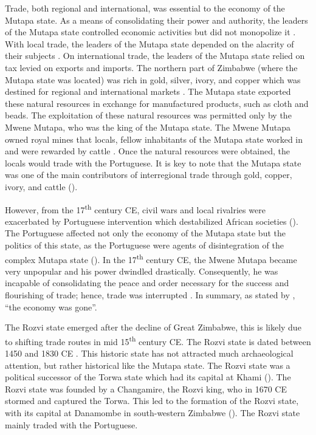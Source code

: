 Trade, both regional and international, was essential to the economy of the Mutapa state. As a means of consolidating their power and authority, the leaders of the Mutapa state controlled economic activities but did not monopolize it
\parencites{mudenge1974}{mudenge1988}.
With local trade, the leaders of the Mutapa state depended on the alacrity of their subjects \parencite{chanaiwa1972}.
On international trade, the leaders of the Mutapa state relied on tax levied on exports and imports. The northern part of Zimbabwe (where the Mutapa state was located) was rich in gold, silver, ivory, and copper which was destined for regional and international markets
\parencite{chanaiwa1972}. The Mutapa state exported these natural resources in exchange for manufactured products, such as cloth and beads. The exploitation of these natural resources was permitted only by the Mwene Mutapa, who was the king of the Mutapa state. The Mwene Mutapa owned royal mines that locals, fellow inhabitants of the Mutapa state worked in and were rewarded by cattle \parencite{chanaiwa1972}. Once the natural resources were obtained, the locals would trade with the Portuguese. It is key to note that the Mutapa state was one of the main contributors of interregional trade through gold, copper, ivory,
and cattle (\cite[][126]{kusimba1999}).

However, from the 17\textsuperscript{th} century CE,
civil wars and local rivalries were exacerbated by Portuguese intervention which destabilized African societies (\cites{chanaiwa1972}{alradi1990}{kinahan2000}).
The Portuguese affected not only the economy of the Mutapa state but the politics of this state, as the Portuguese were agents of disintegration of the complex Mutapa state (\cite[][435]{chanaiwa1972}).
In the 17\textsuperscript{th} century CE, the Mwene Mutapa became very unpopular and his power dwindled drastically. Consequently, he was incapable of consolidating the peace and order necessary for the success and flourishing of trade; hence, trade was interrupted \parencite{chanaiwa1972}.
In summary, as stated by \textcite[][435]{chanaiwa1972}, \enquote{the economy was gone}.


The Rozvi state emerged after the decline of Great Zimbabwe, this is likely due to shifting trade routes in mid 15\textsuperscript{th} century CE. The Rozvi state is dated between 1450 and 1830 CE \parencite{pikirayi2006}. This historic state has not attracted much archaeological attention, but rather historical like the Mutapa state. The Rozvi state was a political successor of the Torwa state which had its capital at Khami
(\cites{pikirayi2006}{pikirayi2013hist}{manyanga2010}). The Rozvi state was founded by a Changamire, the Rozvi king, who in 1670 CE stormed and captured the Torwa. This led to the formation of the Rozvi state, with its capital at Danamombe in south-western Zimbabwe (\cites{mudenge1988}{beach1980}[][17]{huffman1996}). The Rozvi state mainly traded with the Portuguese.

